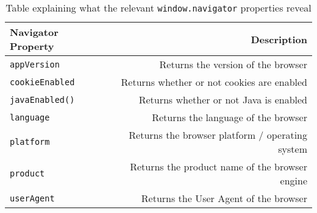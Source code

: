 \begin{table}[h]
    \centering
    \begin{tabular}{| l | r |}
        \hline
        \textbf{Navigator Property} & \textbf{Description} \\ \hline
        \texttt{appVersion} & {Returns the version of the browser} \\ \hline
        \texttt{cookieEnabled} & {Returns whether or not cookies are enabled} \\ \hline
        \texttt{javaEnabled()} & {Returns whether or not Java is enabled} \\ \hline
        \texttt{language} & {Returns the language of the browser} \\ \hline
        \texttt{platform} & {Returns the browser platform / operating system} \\ \hline
        \texttt{product} & {Returns the product name of the browser engine} \\ \hline
        \texttt{userAgent} & {Returns the User Agent of the browser} \\
        \hline
    \end{tabular}
    \caption{Table explaining what the relevant \texttt{window.navigator} properties reveal}
\end{table}

